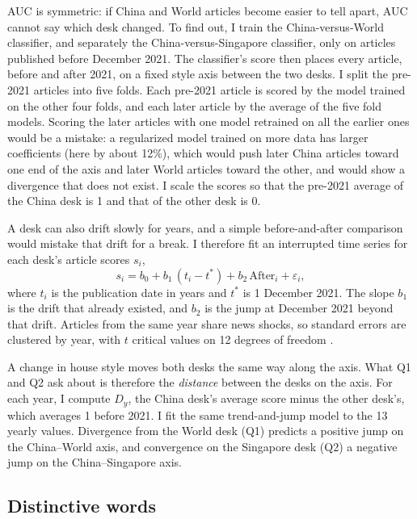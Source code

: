 \documentclass[11pt]{article}
\begin{document}
AUC is symmetric: if China and World articles become easier to tell apart, AUC cannot say which desk changed. To find out, I train the China-versus-World classifier, and separately the China-versus-Singapore classifier, only on articles published before December 2021. The classifier's score then places every article, before and after 2021, on a fixed style axis between the two desks. I split the pre-2021 articles into five folds. Each pre-2021 article is scored by the model trained on the other four folds, and each later article by the average of the five fold models. Scoring the later articles with one model retrained on all the earlier ones would be a mistake: a regularized model trained on more data has larger coefficients (here by about 12\%), which would push later China articles toward one end of the axis and later World articles toward the other, and would show a divergence that does not exist. I scale the scores so that the pre-2021 average of the China desk is 1 and that of the other desk is 0.

A desk can also drift slowly for years, and a simple before-and-after comparison would mistake that drift for a break. I therefore fit an interrupted time series for each desk's article scores $s_i$,
\[
s_i = b_0 + b_1\,(t_i - t^{*}) + b_2\,\text{After}_i + \varepsilon_i,
\]
where $t_i$ is the publication date in years and $t^{*}$ is 1 December 2021. The slope $b_1$ is the drift that already existed, and $b_2$ is the jump at December 2021 beyond that drift. Articles from the same year share news shocks, so standard errors are clustered by year, with $t$ critical values on 12 degrees of freedom \cite{cameron}.

A change in house style moves both desks the same way along the axis. What Q1 and Q2 ask about is therefore the \textit{distance} between the desks on the axis. For each year, I compute $D_y$, the China desk's average score minus the other desk's, which averages 1 before 2021. I fit the same trend-and-jump model to the 13 yearly values. Divergence from the World desk (Q1) predicts a positive jump on the China--World axis, and convergence on the Singapore desk (Q2) a negative jump on the China--Singapore axis.

\subsection{Distinctive words}
\end{document}

